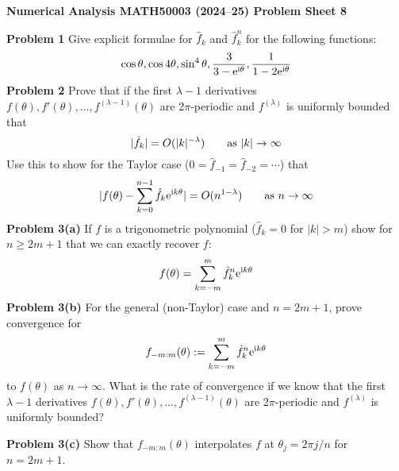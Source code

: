 \documentclass[12pt,a4paper]{article}
\def\endash{–}
\begin{document}
\textbf{Numerical Analysis MATH50003 (2024\ensuremath{\endash}25) Problem Sheet 8}

\textbf{Problem 1} Give explicit formulae for $\hat f_k$ and $\hat f_k^n$ for the following functions:
\[
\cos \ensuremath{\theta}, \cos 4\ensuremath{\theta}, \sin^4\ensuremath{\theta}, {3 \over 3 - {\rm e}^{\rm i \ensuremath{\theta}}}, {1 \over 1 - 2{\rm e}^{\rm i \ensuremath{\theta}}}
\]
\textbf{Problem 2} Prove that if the first $\ensuremath{\lambda}-1$ derivatives $f(\ensuremath{\theta}), f'(\ensuremath{\theta}), \ensuremath{\ldots}, f^{(\ensuremath{\lambda}-1)}(\ensuremath{\theta})$ are 2\ensuremath{\pi}-periodic and $f^{(\ensuremath{\lambda})}$ is uniformly bounded  that
\[
|\hat f_k| = O(|k|^{-\ensuremath{\lambda}})\qquad \hbox{as $|k| \ensuremath{\rightarrow} \ensuremath{\infty}$}
\]
Use this to show for the Taylor case ($0 = \hat f_{-1} = \hat f_{-2} = \ensuremath{\cdots}$) that
\[
|f(\ensuremath{\theta}) - \ensuremath{\sum}_{k=0}^{n-1} \hat f_k {\rm e}^{{\rm i}k\ensuremath{\theta}}| = O(n^{1-\ensuremath{\lambda}})\qquad \hbox{as $n \ensuremath{\rightarrow} \ensuremath{\infty}$}
\]
\textbf{Problem 3(a)} If $f$ is a trigonometric polynomial  ($\hat f_k = 0$ for $|k| > m$) show for $n \ensuremath{\geq} 2m+1$ that we can exactly recover $f$:
\[
f(\ensuremath{\theta}) = \ensuremath{\sum}_{k=-m}^m \hat f_k^n {\rm e}^{{\rm i} k \ensuremath{\theta}}
\]
\textbf{Problem 3(b)} For the general (non-Taylor) case and $n = 2m+1$, prove convergence for
\[
f_{-m:m}(\ensuremath{\theta}) := \ensuremath{\sum}_{k=-m}^m \hat f_k^n {\rm e}^{{\rm i} k \ensuremath{\theta}}
\]
to $f(\ensuremath{\theta})$ as $n \ensuremath{\rightarrow} \ensuremath{\infty}$. What is the rate of convergence if we know that the first $\ensuremath{\lambda}-1$ derivatives $f(\ensuremath{\theta}), f'(\ensuremath{\theta}), \ensuremath{\ldots}, f^{(\ensuremath{\lambda}-1)}(\ensuremath{\theta})$ are 2\ensuremath{\pi}-periodic and $f^{(\ensuremath{\lambda})}$ is uniformly bounded?

\textbf{Problem 3(c)} Show that $f_{-m:m}(\ensuremath{\theta})$ interpolates $f$ at $\ensuremath{\theta}_j = 2\ensuremath{\pi}j/n$ for $n = 2m+1$.
\end{document}

